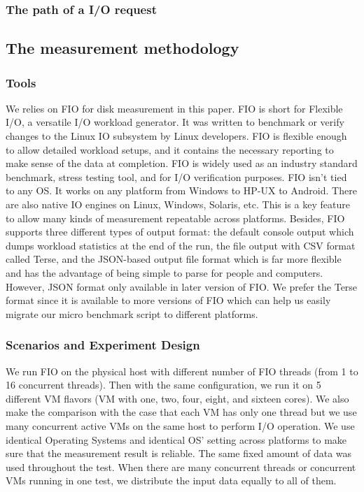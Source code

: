 \documentclass{acmsig}
\begin{document}
  \subsubsection{The path of a I/O request}

\subsection{The measurement methodology}

\subsubsection{Tools}

We relies on FIO for disk measurement in this paper. FIO is short for Flexible I/O, a versatile I/O workload generator. It was written to benchmark or verify changes to the Linux IO subsystem by Linux developers. FIO is flexible enough to allow detailed workload setups, and it contains the necessary reporting to make sense of the data at completion. FIO is widely used as an industry standard benchmark, stress testing tool, and for I/O verification purposes. FIO isn't tied to any OS. It works on any platform from Windows to HP-UX to Android. There are also native IO engines on Linux, Windows, Solaris, etc. This is a key feature to allow many kinds of measurement repeatable across platforms. Besides, FIO supports three different types of output format: the default console output which dumps workload statistics at the end of the run, the file output with CSV format called Terse, and the JSON-based output file format which is far more flexible and has the advantage of being simple to parse for people and computers. However, JSON format only available in later version of FIO. We prefer the Terse format since it is available to more versions of FIO which can help us easily migrate our micro benchmark script to different platforms.

\subsubsection{Scenarios and Experiment Design}

We run FIO on the physical host with different number of FIO threads (from 1 to 16 concurrent threads). Then with the same configuration, we run it on 5 different VM flavors (VM with one, two, four, eight, and sixteen cores). We also make the comparison with the case that each VM has only one thread but we use many concurrent active VMs on the same host to perform I/O operation. We use identical Operating Systems and identical OS' setting across platforms to make sure that the measurement result is reliable. The same fixed amount of data was used throughout the test. When there are many concurrent threads or concurrent VMs running in one test, we distribute the input data equally to all of them.
\end{document}
